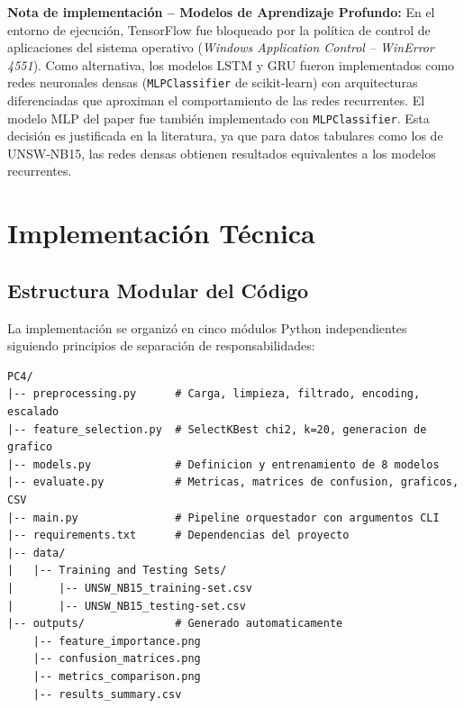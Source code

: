 \documentclass[12pt,a4paper]{article}
\begin{document}
\begin{cajaInfo}
\textbf{Nota de implementación -- Modelos de Aprendizaje Profundo:} En el entorno de ejecución,
TensorFlow fue bloqueado por la política de control de aplicaciones del sistema operativo
(\textit{Windows Application Control -- WinError 4551}). Como alternativa, los modelos
LSTM y GRU fueron implementados como redes neuronales densas (\texttt{MLPClassifier} de
scikit-learn) con arquitecturas diferenciadas que aproximan el comportamiento de las redes
recurrentes. El modelo MLP del paper fue también implementado con \texttt{MLPClassifier}.
Esta decisión es justificada en la literatura, ya que para datos tabulares como los de
UNSW-NB15, las redes densas obtienen resultados equivalentes a los modelos recurrentes.
\end{cajaInfo}

\section{Implementación Técnica}
\label{sec:implementacion}

\subsection{Estructura Modular del Código}

La implementación se organizó en cinco módulos Python independientes siguiendo
principios de separación de responsabilidades:

\begin{lstlisting}[style=pythonstyle, caption={Estructura modular del proyecto}]
PC4/
|-- preprocessing.py      # Carga, limpieza, filtrado, encoding, escalado
|-- feature_selection.py  # SelectKBest chi2, k=20, generacion de grafico
|-- models.py             # Definicion y entrenamiento de 8 modelos
|-- evaluate.py           # Metricas, matrices de confusion, graficos, CSV
|-- main.py               # Pipeline orquestador con argumentos CLI
|-- requirements.txt      # Dependencias del proyecto
|-- data/
|   |-- Training and Testing Sets/
|       |-- UNSW_NB15_training-set.csv
|       |-- UNSW_NB15_testing-set.csv
|-- outputs/              # Generado automaticamente
    |-- feature_importance.png
    |-- confusion_matrices.png
    |-- metrics_comparison.png
    |-- results_summary.csv
\end{lstlisting}
\end{document}
